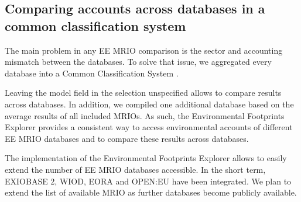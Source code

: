 \subsection{Comparing accounts across databases in a common classification system}

The main problem in any EE MRIO comparison is the sector and accounting
mismatch between the databases. To solve that issue, we aggregated every
database into a Common Classification System \cite{Steen_Olsen_2014}. 

Leaving the model field in the selection unspecified allows to compare results across databases. 
In addition, we compiled one additional database based on the average results of all included MRIOs.
As such, the Environmental Footprints Explorer provides a consistent way to access environmental accounts of different EE MRIO databases and to compare these results across databases.

The implementation of the Environmental Footprints Explorer allows to easily extend the number of EE MRIO databases accessible. In the short term, EXIOBASE 2, WIOD, EORA and OPEN:EU  have been integrated. We plan to extend the list of available MRIO as further databases become publicly available. 
